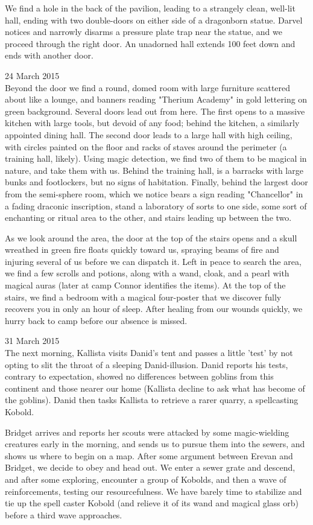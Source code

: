 \documentclass[letterpaper]{article}
\begin{document}
We find a hole in the back of the pavilion, leading to a strangely clean, well-lit hall, ending with two double-doors on either side of a dragonborn statue.  Darvel notices and narrowly disarms a pressure plate trap near the statue, and we proceed through the right door. An unadorned  hall extends 100 feet down and ends with another door.

24 March 2015 \\
Beyond the door we find a round, domed room with large furniture scattered about like a lounge, and banners reading "Therium Academy" in gold lettering on green background.  Several doors lead out from here. The first opens to a massive kitchen with large tools, but devoid of any food; behind the kitchen, a similarly appointed dining hall. The second door leads to a large hall with high ceiling, with circles painted on the floor and racks of staves around the perimeter (a training hall, likely). Using magic detection, we find two of them to be magical in nature, and take them with us. Behind the training hall, is a barracks with large bunks and footlockers, but no signs of habitation. Finally, behind the largest door from the semi-sphere room, which we notice bears a sign reading "Chancellor" in a fading draconic inscription, stand a laboratory of sorts to one side, some sort of enchanting or ritual area to the other, and stairs leading up between the two.

As we look around the area, the door at the top of the stairs opens and a skull wreathed in green fire floats quickly toward us, spraying beams of fire and injuring several of us before we can dispatch it. Left in peace to search the area, we find a few scrolls and potions, along with a wand, cloak, and a pearl with magical auras (later at camp Connor identifies the items). At the top of the stairs, we find a bedroom with a magical four-poster that we discover fully recovers you in only an hour of sleep. After healing from our wounds quickly, we hurry back to camp before our absence is missed. 

31 March 2015 \\
The next morning, Kallista visits Danid's tent and passes a little 'test' by not opting to slit the throat of a sleeping Danid-illusion. Danid reports his tests, contrary to expectation, showed no differences between goblins from this continent and those nearer our home (Kallista decline to ask what has become of the goblins). Danid then tasks Kallista to retrieve a rarer quarry, a spellcasting Kobold.

Bridget arrives and reports her scouts were attacked by some magic-wielding creatures early in the morning, and sends us to pursue them into the sewers, and shows us where to begin on a map. After some argument between Erevan and Bridget, we decide to obey and head out. We enter a sewer grate and descend, and after some exploring, encounter a group of Kobolds, and then a wave of reinforcements, testing our resourcefulness. We have barely time to stabilize and tie up the spell caster Kobold (and relieve it of its wand and magical glass orb) before a third wave approaches.
\end{document}
